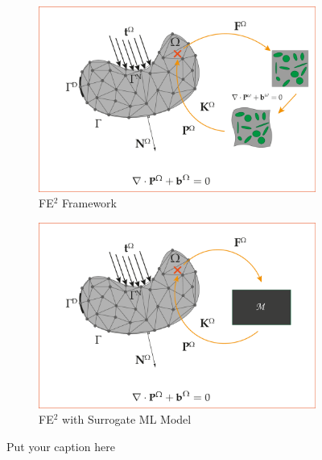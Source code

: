 \documentclass{article}
\begin{document}
\begin{figure}[!ht]
\begin{subfigure}{.5\textwidth}
  \centering
  \includegraphics[width=\linewidth]{Figures/FE2}  
  \caption{FE$^2$ Framework}
  \label{fig:fe2}
\end{subfigure}
\begin{subfigure}{.5\textwidth}
  \centering
  \includegraphics[width=\linewidth]{Figures/FE2-ML}  
  \caption{FE$^2$ with Surrogate ML Model}
  \label{fig:ml}
\end{subfigure}
\caption{Put your caption here}
\label{fig:problem}
\end{figure}
\end{document}
